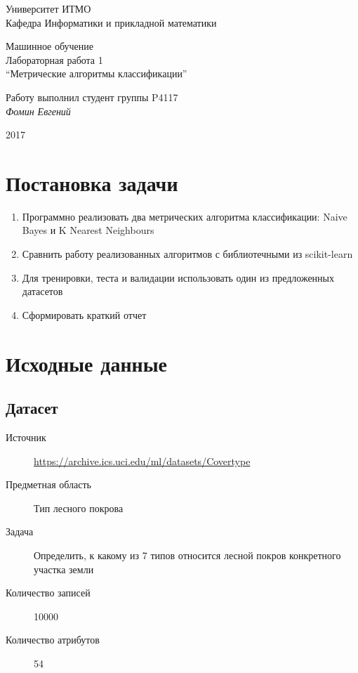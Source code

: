\documentclass[12pt, a4paper] {article}
\begin{document}
\thispagestyle{empty}
\begin{center}
  {\large
    Университет ИТМО \\
    Кафедра Информатики и прикладной математики \\
  }
\end{center}
\begin{center}
  {\large
    Машинное обучение\\
  }
  {\large
    Лабораторная работа 1\\
    ``Метрические алгоритмы классификации''\\
  }
\end{center}
\begin{flushright}
  Работу выполнил студент группы P4117\\
  {\it Фомин Евгений\\
  }
\end{flushright}
\begin{center}
  2017
\end{center}
\newpage

\section{Постановка задачи}

\begin{enumerate}
  \item Программно реализовать два метрических алгоритма классификации:
    Naive Bayes и K Nearest Neighbours
  \item Сравнить работу реализованных алгоритмов с библиотечными из scikit-learn
  \item Для тренировки, теста и валидации использовать один из предложенных датасетов
  \item Сформировать краткий отчет
\end{enumerate}

\section{Исходные данные}
\subsection{Датасет}
\begin{description}
  \item[Источник] \href{https://archive.ics.uci.edu/ml/datasets/Covertype}{https://archive.ics.uci.edu/ml/datasets/Covertype}
  \item[Предметная область] Тип лесного покрова
  \item[Задача]Определить, к какому из 7 типов относится лесной покров конкретного участка земли
  \item[Количество записей] 10000
  \item[Количество атрибутов] 54
\end{description}
\end{document}
